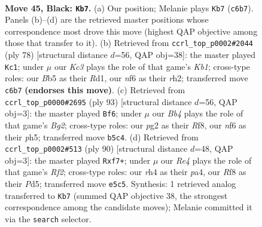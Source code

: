 \documentclass[11pt]{article}
\begin{document}
\clearpage

\begin{figure}[p]\centering
\begin{subfigure}{0.46\textwidth}\centering
\resizebox{\linewidth}{!}{%
\newchessgame
\chessboard[
  setfen={5r2/5B2/2k2N2/1b2rp2/1P5R/8/2R3P1/3KN3 b - - 6 45},
  showmover=false,
  pgfstyle=straightmove, color=movearrow, markmove={c6-b7}
]}
\caption{}
\end{subfigure}\hfill
\begin{subfigure}{0.46\textwidth}\centering
\resizebox{\linewidth}{!}{%
\newchessgame
\chessboard[
  setfen={8/5pkp/4n3/3B1R2/2P3PP/1r6/7r/1K1R4 w - - 5 40},
  showmover=false,
  pgfstyle=straightmove, color=movearrow, markmove={b1-c1}
]}
\caption{}
\end{subfigure}
\\[4pt]
\begin{subfigure}{0.46\textwidth}\centering
\resizebox{\linewidth}{!}{%
\newchessgame
\chessboard[
  setfen={5r1k/6bp/4R3/6RP/5P2/r7/4N1K1/8 b - - 2 47},
  showmover=false,
  pgfstyle=straightmove, color=movearrow, markmove={g7-f6}
]}
\caption{}
\end{subfigure}\hfill
\begin{subfigure}{0.46\textwidth}\centering
\resizebox{\linewidth}{!}{%
\newchessgame
\chessboard[
  setfen={7r/2p2rk1/8/2RPp1n1/p3B3/P5K1/5R2/8 w - - 0 46},
  showmover=false,
  pgfstyle=straightmove, color=movearrow, markmove={f2-f7}
]}
\caption{}
\end{subfigure}
\caption{\textbf{Move 45, Black: \texttt{Kb7}.} (a) Our position; Melanie plays \texttt{Kb7} (\texttt{c6b7}). Panels (b)--(d) are the retrieved master positions whose correspondence most drove this move (highest QAP objective among those that transfer to it). (b) Retrieved from \texttt{ccrl\_top\_p0002\#2044} (ply 78) [structural distance $d$=56, QAP obj=38]: the master played \texttt{Kc1}; under $\mu$ our \emph{Kc3} plays the role of that game's \emph{Kb1}; cross-type roles: our \emph{B}b5 as their \emph{R}d1, our \emph{n}f6 as their \emph{r}h2; transferred move \texttt{c6b7} \textbf{(endorses this move)}. (c) Retrieved from \texttt{ccrl\_top\_p0000\#2695} (ply 93) [structural distance $d$=56, QAP obj=3]: the master played \texttt{Bf6}; under $\mu$ our \emph{Bb4} plays the role of that game's \emph{Bg2}; cross-type roles: our \emph{p}g2 as their \emph{R}f8, our \emph{n}f6 as their \emph{p}h5; transferred move \texttt{b5c4}. (d) Retrieved from \texttt{ccrl\_top\_p0002\#513} (ply 90) [structural distance $d$=48, QAP obj=3]: the master played \texttt{Rxf7+}; under $\mu$ our \emph{Re4} plays the role of that game's \emph{Rf2}; cross-type roles: our \emph{r}h4 as their \emph{p}a4, our \emph{R}f8 as their \emph{P}d5; transferred move \texttt{e5c5}. Synthesis: 1 retrieved analog transferred to \texttt{Kb7} (summed QAP objective 38, the strongest correspondence among the candidate moves); Melanie committed it via the \texttt{search} selector.}
\label{fig:thought-m89}
\end{figure}
\end{document}
